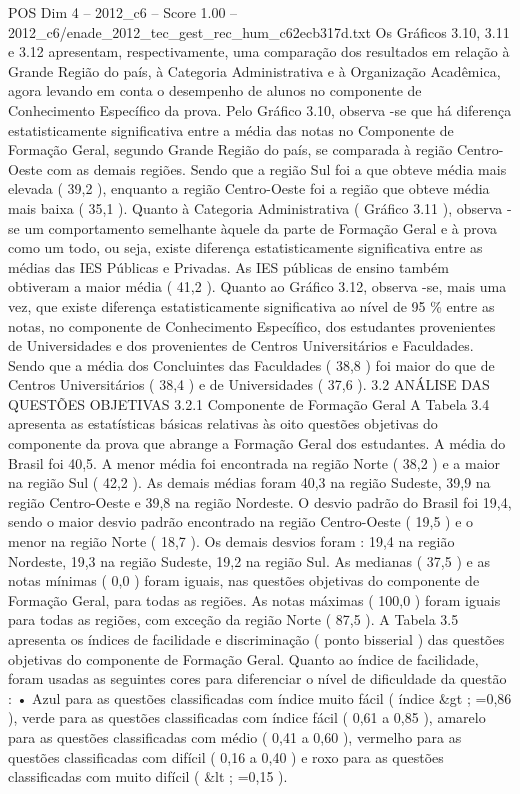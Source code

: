 \begin{textsample}{POS Dim 4 – 2012\_c6 – Score 1.00 – 2012\_c6/enade\_2012\_tec\_gest\_rec\_hum\_c62ecb317d.txt}
Os Gráficos 3.10, 3.11 e 3.12 apresentam, respectivamente, uma comparação dos resultados em relação à Grande Região do país, à Categoria Administrativa e à Organização Acadêmica, agora levando em conta o desempenho de alunos no componente de Conhecimento Específico da prova.
Pelo Gráfico 3.10, observa -se que há diferença estatisticamente significativa entre a média das notas no Componente de Formação Geral, segundo Grande Região do país, se comparada à região Centro-Oeste com as demais regiões.
Sendo que a região Sul foi a que obteve média mais elevada ( 39,2 ), enquanto a região Centro-Oeste foi a região que obteve média mais baixa ( 35,1 ).
Quanto à Categoria Administrativa ( Gráfico 3.11 ), observa -se um comportamento semelhante àquele da parte de Formação Geral e à prova como um todo, ou seja, existe diferença estatisticamente significativa entre as médias das IES Públicas e Privadas.
As IES públicas de ensino também obtiveram a maior média ( 41,2 ).
Quanto ao Gráfico 3.12, observa -se, mais uma vez, que existe diferença estatisticamente significativa ao nível de 95 \% entre as notas, no componente de Conhecimento Específico, dos estudantes provenientes de Universidades e dos provenientes de Centros Universitários e Faculdades.
Sendo que a média dos Concluintes das Faculdades ( 38,8 ) foi maior do que de Centros Universitários ( 38,4 ) e de Universidades ( 37,6 ). 3.2 ANÁLISE DAS QUESTÕES OBJETIVAS 3.2.1 Componente de Formação Geral A Tabela 3.4 apresenta as estatísticas básicas relativas às oito questões objetivas do componente da prova que abrange a Formação Geral dos estudantes.
A média do Brasil foi 40,5.
A menor média foi encontrada na região Norte ( 38,2 ) e a maior na região Sul ( 42,2 ).
As demais médias foram 40,3 na região Sudeste, 39,9 na região Centro-Oeste e 39,8 na região Nordeste.
O desvio padrão do Brasil foi 19,4, sendo o maior desvio padrão encontrado na região Centro-Oeste ( 19,5 ) e o menor na região Norte ( 18,7 ).
Os demais desvios foram : 19,4 na região Nordeste, 19,3 na região Sudeste, 19,2 na região Sul.
As medianas ( 37,5 ) e as notas mínimas ( 0,0 ) foram iguais, nas questões objetivas do componente de Formação Geral, para todas as regiões.
As notas máximas ( 100,0 ) foram iguais para todas as regiões, com exceção da região Norte ( 87,5 ).
A Tabela 3.5 apresenta os índices de facilidade e discriminação ( ponto bisserial ) das questões objetivas do componente de Formação Geral.
Quanto ao índice de facilidade, foram usadas as seguintes cores para diferenciar o nível de dificuldade da questão : • Azul para as questões classificadas com índice muito fácil ( índice \&gt ; =0,86 ), verde para as questões classificadas com índice fácil ( 0,61 a 0,85 ), amarelo para as questões classificadas com médio ( 0,41 a 0,60 ), vermelho para as questões classificadas com difícil ( 0,16 a 0,40 ) e roxo para as questões classificadas com muito difícil ( \&lt ; =0,15 ).

\end{textsample}
